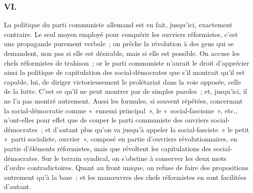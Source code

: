\documentclass[french,twoside]{book} %
\begin{document}
\subsubsection[{VI.}]{VI.}
\noindent La politique du parti communiste allemand est en fait, jusqu'ici, exacte­ment contraire. Le seul moyen employé pour conquérir les ouvriers réfor­mistes, c'est une propagande purement verbale ; on prêche la révolution à des gens qui se demandent, non pas si elle est désirable, mais si elle est possible. On accuse les chefs réformistes de trahison ; or le parti communiste n'aurait le droit d'apprécier ainsi la politique de capitulation des social-démocrates que s'il montrait qu'il est capable, lui, de diriger victorieusement le prolétariat dans la voie opposée, celle de la lutte. C'est ce qu'il ne peut montrer par de simples paroles ; et, jusqu'ici, il ne l'a pas montré autrement. Aussi les formules, si souvent répétées, concernant la social-démocratie comme « ennemi princi­pal », le « social-fascisme », etc., n'ont-elles pour effet que de couper le parti communiste des ouvriers social-démocrates ; et d'autant plus qu'on va jusqu’à appeler la social-fasciste » le petit « parti socialiste, ouvrier », composé en partie d'ouvriers révolutionnaires, en partie d'éléments réformistes, mais que révoltent les capitulations des social-démocrates. Sur le terrain syndical, on s'obstine à conserver les deux mots d'ordre contradictoires. Quant au front unique, on refuse de faire des propositions autrement qu'à la base ; et les manœuvres des chefs réformistes en sont facilitées d'autant.\par
\end{document}
